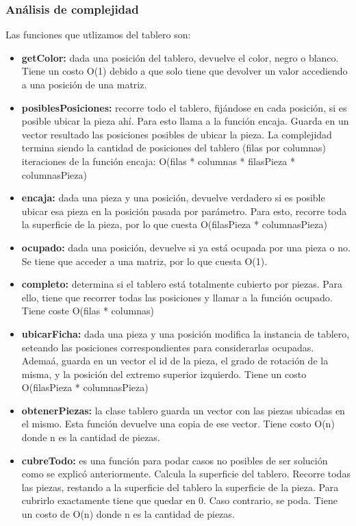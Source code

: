 \subsubsection{An\'alisis de complejidad}

Las funciones que utlizamos del tablero son:

\begin{itemize}

\item \textbf{getColor:} dada una posici\'on del tablero, devuelve el color, negro o blanco. Tiene un costo O(1) debido a que solo tiene que devolver un valor accediendo a una posici\'on de una matriz.

\item \textbf{posiblesPosiciones:} recorre todo el tablero, fij\'andose en cada posici\'on, si es posible ubicar la pieza ah\'i. Para esto llama a la funci\'on encaja. Guarda en un vector resultado las posiciones posibles de ubicar la pieza. La complejidad termina siendo la cantidad de posiciones del tablero (filas por columnas) iteraciones de la funci\'on encaja: O(filas * columnas * filasPieza * columnasPieza)

\item \textbf{encaja:} dada una pieza y una posici\'on, devuelve verdadero si es posible ubicar esa pieza en la posici\'on pasada por par\'ametro. Para esto, recorre toda la superficie de la pieza, por lo que cuesta O(filasPieza * columnasPieza)

\item \textbf{ocupado:} dada una posici\'on, devuelve si ya está ocupada por una pieza o no. Se tiene que acceder a una matriz, por lo que cuesta O(1).

\item \textbf{completo:} determina si el tablero est\'a totalmente cubierto por piezas. Para ello, tiene que recorrer todas las posiciones y llamar a la funci\'on ocupado. Tiene coste O(filas * columnas)

\item \textbf{ubicarFicha:} dada una pieza y una posici\'on modifica la instancia de tablero, seteando las posiciones correspondientes para considerarlas ocupadas. Adema\'a, guarda en un vector el id de la pieza, el grado de rotaci\'on de la misma, y la posici\'on del extremo superior izquierdo. Tiene un costo O(filasPieza * columnasPieza)

\item \textbf{obtenerPiezas:} la clase tablero guarda un vector con las piezas ubicadas en el mismo. Esta funci\'on devuelve una copia de ese vector. Tiene costo O(n) donde n es la cantidad de piezas.

\item \textbf{cubreTodo:} es una funci\'on para podar casos no posibles de ser soluci\'on como se explic\'o anteriormente. Calcula la superficie del tablero. Recorre todas las piezas, restando a la superficie del tablero la superficie de la pieza. Para cubrirlo exactamente tiene que quedar en 0. Caso contrario, se poda. Tiene un costo de O(n) donde n es la cantidad de piezas.

\end{itemize}

